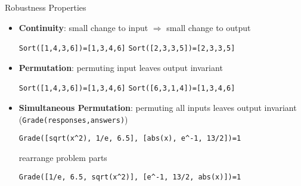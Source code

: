 \documentclass[usenames,dvipsnames]{beamer}
\begin{document}
\begin{frame}[fragile]{Robustness Properties}
    \begin{itemize}[<+->]
        \item {\bf Continuity}: small change to input \(\Rightarrow\) small change to output
        \begin{center}
            \verb!Sort([1,4,3,6])=[1,3,4,6]!
            \verb!Sort([2,3,3,5])=[2,3,3,5]!
        \end{center}
%
%
            
    \item {\bf Permutation}: permuting input leaves output invariant
        \begin{center}
            \verb!Sort([1,4,3,6])=[1,3,4,6]!
            \verb!Sort([6,3,1,4])=[1,3,4,6]!
        \end{center}
    \item {\bf Simultaneous Permutation}: permuting all inputs leaves output invariant (\verb!Grade(responses,answers)!)
        \begin{center}

            \verb!Grade([sqrt(x^2), 1/e, 6.5], [abs(x), e^-1, 13/2])=1!

            rearrange problem parts

            \verb!Grade([1/e, 6.5, sqrt(x^2)], [e^-1, 13/2, abs(x)])=1!
        \end{center}
    \end{itemize}
\end{frame}
\end{document}
